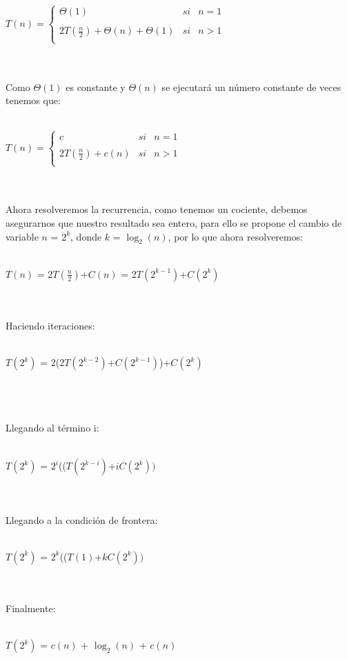 \documentclass[12pt,twoside]{article}
\begin{document}
\centerline{$T(n)= \left\{\begin{array}{lcc}
             \Theta(1) &   si  & n = 1 \\
             \\ 2T(\frac{n}{2}) + \Theta(n) + \Theta(1) &  si & n > 1\\
             \end{array}
   \right.$}\\\\
Como $\Theta(1)$ es constante y $\Theta(n)$ se ejecutar\'a un n\'umero constante de veces tenemos que:\\\\
\centerline{$T(n)= \left\{\begin{array}{lcc}
             c &   si  & n = 1 \\
             \\ 2T(\frac{n}{2}) + c(n) &  si & n > 1\\
             \end{array}
   \right.$}\\\\
Ahora resolveremos la recurrencia, como tenemos un cociente, debemos asegurarnos que nuestro resultado sea entero, para ello se propone el cambio de variable $n$ = $2^{k}$, donde $k$ = $\log_{2}(n)$, por lo que ahora resolveremos:\\\\
\centerline{$T(n)$ = 2$T(\frac{n}{2})$+$C(n)$ = 2$T(2^{k-1})$+$C(2^{k})$}\\\\
Haciendo iteraciones:\\\\
\centerline{$T(2^{k})$ = 2(2$T(2^{k-2})$+$C(2^{k-1})$)+$C(2^{k})$}\\\\\\
Llegando al t\'ermino i:\\\\
\centerline{$T(2^{k})$ = $2^{i}$(($T(2^{k-i})$+$iC(2^{k}))$}\\\\
Llegando a la condici\'on de frontera:\\\\
\centerline{$T(2^{k})$ = $2^{k}$(($T(1)$+$kC(2^{k}))$}\\\\
Finalmente:\\\\
\centerline{$T(2^{k})$ = $c(n)$ + $\log_{2}(n)$ + $c(n)$}\\\\
\end{document}
